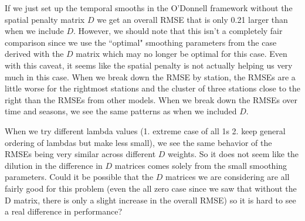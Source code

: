 \documentclass[12pt]{amsart}
\begin{document}
If we just set up the temporal smooths in the O'Donnell framework without the spatial penalty matrix $D$ we get an overall RMSE that is only 0.21 larger than when we include $D$. However, we should note that this isn't a completely fair comparison since we use the ``optimal" smoothing parameters from the case derived with the $D$ matrix which may no longer be optimal for this case. Even with this caveat, it seems like the spatial penalty is not actually helping us very much in this case. When we break down the RMSE by station, the RMSEs are a little worse for the rightmost stations and the cluster of three stations close to the right than the RMSEs from other models. When we break down the RMSEs over time and seasons, we see the same patterns as when we included $D$.

When we try different lambda values (1. extreme case of all 1s 2. keep general ordering of lambdas but make less small), we see the same behavior of the RMSEs being very similar across different $D$ weights. So it does not seem like the dilution in the difference in $D$ matrices comes solely from the small smoothing parameters. Could it be possible that the $D$ matrices we are considering are all fairly good for this problem (even the all zero case since we saw that without the D matrix, there is only a slight increase in the overall RMSE) so it is hard to see a real difference in performance?






\textbf{}
\end{document}
